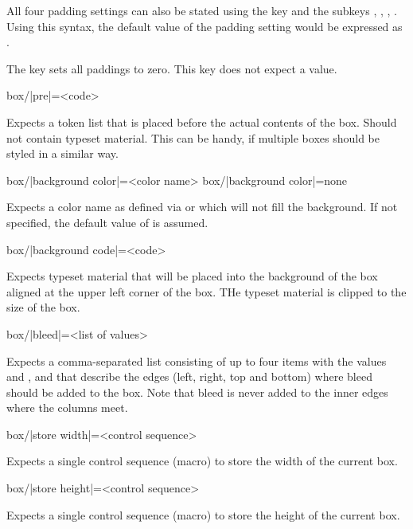\documentclass[a4paper]{article}
\begin{document}
All four padding settings can also be stated using the  key and the subkeys , , , . Using this syntax, the default value of the padding setting would be expressed as .

The key  sets all paddings to zero. This key does not expect a value.

\begin{macrodef}
box/|pre|={<code>}
\end{macrodef}
Expects a token list that is placed before the actual contents of the box. Should not contain typeset material. This can be handy, if multiple boxes should be styled in a similar way.

\begin{macrodef}
box/|background color|={<color name>}
box/|background color|={none}
\end{macrodef}
Expects a color name as defined via  or  which will not fill the background. If not specified, the default value of  is assumed.

\begin{macrodef}
box/|background code|={<code>}
\end{macrodef}
Expects typeset material that will be placed into the background of the box aligned at the upper left corner of the box. THe typeset material is clipped to the size of the box.

\begin{macrodef}
box/|bleed|={<list of values>}
\end{macrodef}
Expects a comma-separated list consisting of up to four items with the values  and ,  and  that describe the edges (left, right, top and bottom) where bleed should be added to the box. Note that bleed is never added to the inner edges where the columns meet.

\begin{macrodef}
box/|store width|={<control sequence>}
\end{macrodef}
Expects a single control sequence (macro) to store the width of the current box.

\begin{macrodef}
box/|store height|={<control sequence>}
\end{macrodef}
Expects a single control sequence (macro) to store the height of the current box.
\end{document}
